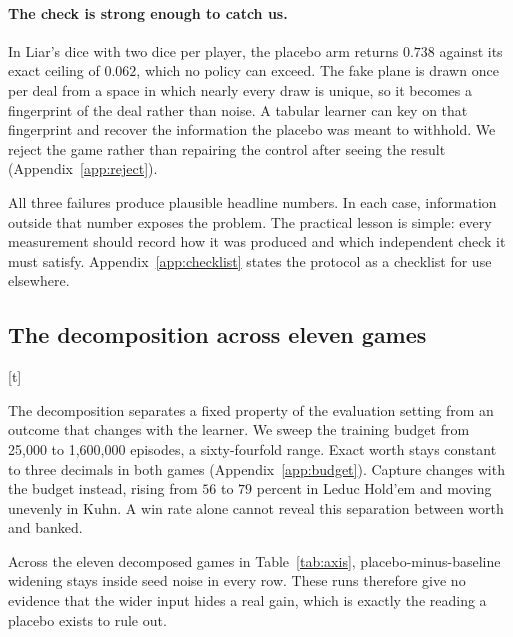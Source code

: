\documentclass{article}
\makeatletter
\renewenvironment{table}
{\setlength{\abovecaptionskip}{10\p@}%
   \setlength{\belowcaptionskip}{\z@}%
\@float{table}} {\end@float}
\makeatother
\begin{document}
\paragraph{The check is strong enough to catch us.} In Liar's dice with two dice per player, the placebo arm returns $0.738$ against its exact ceiling of $0.062$, which no policy can exceed. The fake plane is drawn once per deal from a space in which nearly every draw is unique, so it becomes a fingerprint of the deal rather than noise. A tabular learner can key on that fingerprint and recover the information the placebo was meant to withhold. We reject the game rather than repairing the control after seeing the result (Appendix~\ref{app:reject}).

All three failures produce plausible headline numbers. In each case, information outside that number exposes the problem. The practical lesson is simple: every measurement should record how it was produced and which independent check it must satisfy. Appendix~\ref{app:checklist} states the protocol as a checklist for use elsewhere.

\subsection{The decomposition across eleven games}
\label{sec:r-decomp}

\begin{table}[t]
  \centering \small
  
  \caption{The decomposition over eleven games spanning 1.00 to 3.67 bits, eight seeds each. Worth is the exact gap between the two ceilings for this opponent policy, banked is the oracle arm minus the baseline arm, and capture is their ratio. Equation~\eqref{eq:identity} shows how unequal ceiling gaps place capture above or below $100$ percent without explaining why they differ. Widening is the placebo arm minus the baseline arm.}
  \label{tab:axis}
\end{table}

The decomposition separates a fixed property of the evaluation setting from an outcome that changes with the learner. We sweep the training budget from 25{,}000 to 1{,}600{,}000 episodes, a sixty-fourfold range. Exact worth stays constant to three decimals in both games (Appendix~\ref{app:budget}). Capture changes with the budget instead, rising from $56$ to $79$ percent in Leduc Hold'em and moving unevenly in Kuhn. A win rate alone cannot reveal this separation between worth and banked.

Across the eleven decomposed games in Table~\ref{tab:axis}, placebo-minus-baseline widening stays inside seed noise in every row. These runs therefore give no evidence that the wider input hides a real gain, which is exactly the reading a placebo exists to rule out.
\end{document}
